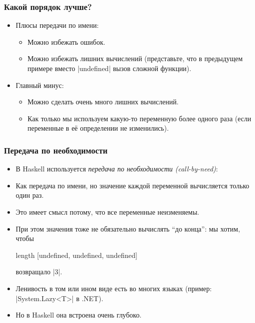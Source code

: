 \documentclass[11pt]{beamer}
\begin{document}
\begin{frame}[fragile]
  \frametitle{Какой порядок лучше?}
  \begin{itemize}
    \item Плюсы передачи по имени:
          \pause
          \begin{itemize}
            \item Можно избежать ошибок.
            \item Можно избежать лишних вычислений
                  \pause (представьте, что в предыдущем примере вместо \haskinline|undefined| вызов сложной функции).
          \end{itemize}
          \pause
    \item Главный минус:
          \pause
          \begin{itemize}
            \item Можно сделать очень много лишних вычислений.
                  \pause
            \item Как только мы используем какую-то переменную более одного раза
                  \pause (если переменные в её определении не изменились).
          \end{itemize}
  \end{itemize}
\end{frame}

\begin{frame}[fragile]
  \frametitle{Передача по необходимости}
  \begin{itemize}
    \item В Haskell используется \emph{передача по необходимости (call-by-need)}:
    \item Как передача по имени, но значение каждой переменной вычисляется только один раз.
          \pause
    \item Это имеет смысл потому, что все переменные неизменяемы.
          \pause
    \item При этом значения тоже не обязательно вычислять \enquote{до конца}: мы хотим, чтобы
          \begin{haskell}
            length [undefined, undefined, undefined]
          \end{haskell}
          возвращало \haskinline|3|.
          \pause
    \item Ленивость в том или ином виде есть во многих языках (пример: \haskinline|System.Lazy<T>| в .NET).
    \item Но в Haskell она встроена очень глубоко.
  \end{itemize}
\end{frame}
\end{document}
